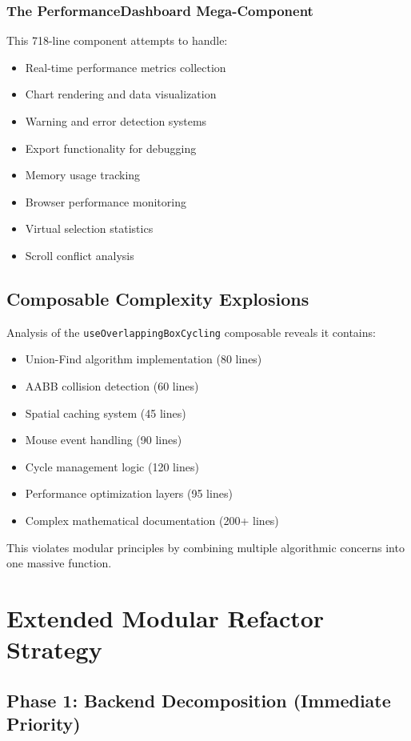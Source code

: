 \documentclass[11pt]{article}
\begin{document}
\subsubsection{The PerformanceDashboard Mega-Component}

This 718-line component attempts to handle:
\begin{itemize}
\item Real-time performance metrics collection
\item Chart rendering and data visualization  
\item Warning and error detection systems
\item Export functionality for debugging
\item Memory usage tracking
\item Browser performance monitoring
\item Virtual selection statistics
\item Scroll conflict analysis
\end{itemize}

\subsection{Composable Complexity Explosions}

Analysis of the \texttt{useOverlappingBoxCycling} composable reveals it contains:

\begin{itemize}
\item Union-Find algorithm implementation (80 lines)
\item AABB collision detection (60 lines) 
\item Spatial caching system (45 lines)
\item Mouse event handling (90 lines)
\item Cycle management logic (120 lines)
\item Performance optimization layers (95 lines)
\item Complex mathematical documentation (200+ lines)
\end{itemize}

This violates modular principles by combining multiple algorithmic concerns into one massive function.

\section{Extended Modular Refactor Strategy}

\subsection{Phase 1: Backend Decomposition (Immediate Priority)}
\end{document}
